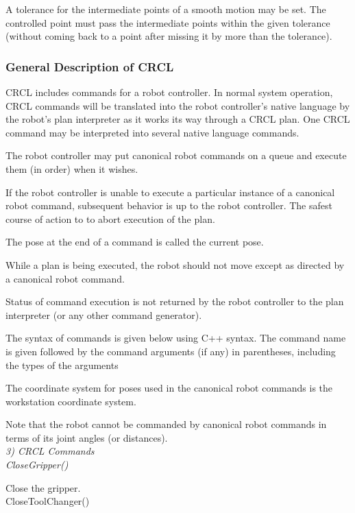 A tolerance for the intermediate points of a smooth motion may be set.
The controlled point must pass the intermediate points within the
given tolerance (without coming back to a point after missing it by
more than the tolerance).\\

\subsubsection{General Description of CRCL}

CRCL includes commands for a robot controller. In normal system operation,
CRCL commands will be translated into the robot controller's native
language by the robot's plan interpreter as it works its way through a
CRCL plan. One CRCL command may be interpreted into several native
language commands.

The robot controller may put canonical robot commands on a queue and
execute them (in order) when it wishes.

If the robot controller is unable to execute a particular instance of a
canonical robot command, subsequent behavior is up to the robot
controller. The safest course of action to to abort execution of the
plan.

The pose at the end of a command is called the current pose.

While a plan is being executed, the robot should not move except as
directed by a canonical robot command.

Status of command execution is not returned by the robot controller to
the plan interpreter (or any other command generator).

The syntax of commands is given below using C++ syntax. The command
name is given followed by the command arguments (if any) in parentheses,
including the types of the arguments

The coordinate system for poses used in the canonical robot commands is
the workstation coordinate system.

Note that the robot cannot be commanded by canonical robot commands in
terms of its joint angles (or distances).\\

\it 3) CRCL Commands\rm \\

\sf CloseGripper()\rm

Close the gripper.\\

\sf CloseToolChanger()\rm

